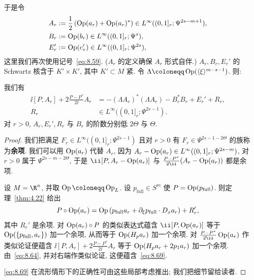 于是令
\begin{equation}\label{eq:8.68}
    \begin{aligned}
        A_r &:= \frac{1}{2}\left( \operatorname{Op}(a_r) + \operatorname{Op}(a_r)^* \right) \in L^\infty((0, 1]_r; \Psi^{2s-m+1}), \\
        B_r &:= \operatorname{Op}(b_r) \in L^\infty((0, 1]_r; \Psi^s), \\
        E_r' &:= \operatorname{Op}(e_r') \in L^\infty((0, 1]_r; \Psi^{2s}),
    \end{aligned}
\end{equation}
这里我们再次使用记号~\eqref{eq:8.59}. ($A_r$ 的定义确保 $A_r$ 形式自伴.) $A_r, B_r, E_r'$ 的 Schwartz 核含于 $K' \times K'$, 其中 $K' \subset M$ 紧. 令 $\Lambda \defeq \Op(\langle \xi \rangle^{m-s-1})$. 则:

\begin{lemma}[正则化对易子的计算]\label{lem:8.16}
我们有
\begin{equation}\label{eq:8.69}
    \begin{aligned}
        \ii[P, A_r] + 2\frac{P - P^*}{2\ii}A_r &= -(\Lambda A_r)^*(\Lambda A_r) - B_r^*B_r + E_r' + R_r, \\
        R_r &\in L^\infty((0, 1]_r; \Psi^{2s-1}).
    \end{aligned}
\end{equation}
对 $r > 0$, $A_r, E_r', R_r$ 与 $B_r$ 的阶数分别低 $2\Theta$ 与 $\Theta$.
\end{lemma}

\begin{proof}
我们把满足 $F_r \in L^\infty((0, 1]_r; \Psi^{2s-1})$ 且对 $r > 0$ 有 $F_r \in \Psi^{2s-1-2\Theta}$ 的族称为\textbf{余项}. 我们可以用 $\operatorname{Op}(a_r)$ 代替 $A_r$, 因为 $A_r - \operatorname{Op}(a_r) \in L^\infty((0, 1]_r; \Psi^{2s-m})$, 对 $r > 0$ 属于 $\Psi^{2s-m-2\Theta}$, 于是 $\ii[P, A_r - \Op(a_r)]$ 与 $\frac{P - P^*}{2\ii}(A_r - \Op(a_r))$ 都是余项.

设 $M = \R^n$, 并取 $\Op \defeq \Op_L$. 设 $p_{\mathrm{full}} \in S^m$ 使 $P = \operatorname{Op}(p_{\mathrm{full}})$. 则定理~\ref{thm:4.22} 给出
\begin{equation}\label{eq:8.70}
    P \circ \operatorname{Op}(a_r) = \operatorname{Op}\left( p_{\mathrm{full}}a_r + \partial_\xi p_{\mathrm{full}} \cdot D_x a_r \right) + R_r',
\end{equation}
其中 $R_r'$ 是余项. 对 $\operatorname{Op}(a_r) \circ P$ 的类似表达式蕴含 $\ii[P, \Op(a_r)]$ 等于 $\operatorname{Op}(\{p_{\mathrm{full}}, a_r\})$ 加一个余项, 从而等于 $\operatorname{Op}(H_p a_r)$ 加一个余项. 对 $\frac{P - P^*}{2\ii}\Op(a_r)$ 作类似论证便蕴含 $\ii[P, A_r] + 2\frac{P - P^*}{2\ii}A_r$ 等于 $\operatorname{Op}(H_p a_r + 2p_1 a_r)$ 加一个余项. 由~\eqref{eq:8.64}, 并对右端作类似论证, 这便蕴含~\eqref{eq:8.69}.

\eqref{eq:8.69} 在流形情形下的正确性可由这些局部考虑推出; 我们把细节留给读者.
\end{proof}


